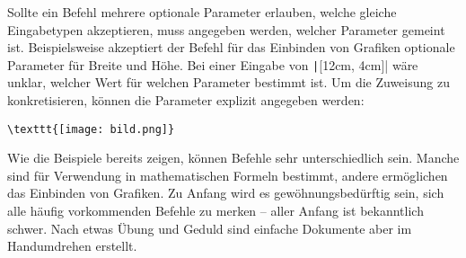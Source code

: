 Sollte ein Befehl mehrere optionale Parameter erlauben, welche gleiche Eingabetypen akzeptieren, muss angegeben werden, welcher Parameter gemeint ist. Beispielsweise akzeptiert der Befehl für das Einbinden von Grafiken optionale Parameter für Breite und Höhe. Bei einer Eingabe von \texttt|[12cm, 4cm]| wäre unklar, welcher Wert für welchen Parameter bestimmt ist. Um die Zuweisung zu konkretisieren, können die Parameter explizit angegeben werden:
\begin{verbatim}
\texttt{[image: bild.png]}
\end{verbatim}

Wie die Beispiele bereits zeigen, können Befehle sehr unterschiedlich sein. Manche sind für Verwendung in mathematischen Formeln bestimmt, andere ermöglichen das Einbinden von Grafiken. Zu Anfang wird es gewöhnungsbedürftig sein, sich alle häufig vorkommenden Befehle zu merken -- aller Anfang ist bekanntlich schwer. Nach etwas Übung und Geduld sind einfache Dokumente aber im Handumdrehen erstellt. 